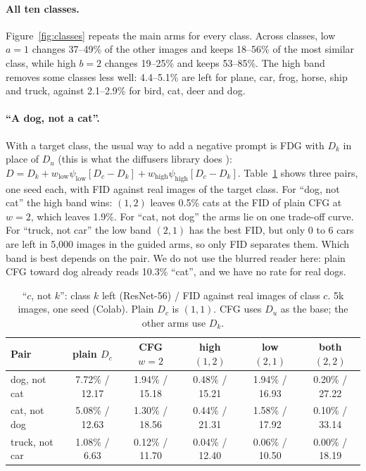 \documentclass[11pt]{article}
\newcommand{\low}{\psi_{\mathrm{low}}}
\newcommand{\high}{\psi_{\mathrm{high}}}
\begin{document}
\paragraph{All ten classes.} Figure~\ref{fig:classes} repeats the main arms for every class. Across classes, low $a = 1$
changes 37--49\% of the other images and keeps 18--56\% of the most similar class, while high $b = 2$ changes 19--25\%
and keeps 53--85\%. The high band removes some classes less well: 4.4--5.1\% are left for plane, car, frog, horse, ship
and truck, against 2.1--2.9\% for bird, cat, deer and dog.

\paragraph{``A dog, not a cat''.} With a target class, the usual way to add a negative prompt is FDG with $D_k$ in place
of $D_u$ (this is what the diffusers library does \cite{diffusers}): $D = D_k + w_{\mathrm{low}} \low[D_c - D_k] +
w_{\mathrm{high}} \high[D_c - D_k]$. Table~\ref{tab:pairs} shows three pairs, one seed each, with FID against real
images of the target class. For ``dog, not cat'' the high band wins: $(1,2)$ leaves 0.5\% cats at the FID of plain CFG
at $w = 2$, which leaves 1.9\%. For ``cat, not dog'' the arms lie on one trade-off curve. For ``truck, not car'' the
low band $(2,1)$ has the best FID, but only 0 to 6 cars are left in 5,000 images in the guided arms, so only FID
separates them. Which band is best depends on the pair. We do not use the blurred reader here: plain CFG toward dog
already reads 10.3\% ``cat'', and we have no rate for real dogs.

\begin{table}[t]
  \centering
  \small
  \caption{``$c$, not $k$'': class $k$ left (ResNet-56) / FID against real images of class $c$. 5k images, one seed
  (Colab). Plain $D_c$ is $(1,1)$. CFG uses $D_u$ as the base; the other arms use $D_k$.}
  \label{tab:pairs}
  \begin{tabular}{lccccc}
    \toprule
    Pair & plain $D_c$ & CFG $w = 2$ & high $(1,2)$ & low $(2,1)$ & both $(2,2)$ \\
    \midrule
    dog, not cat   & 7.72\% / 12.17 & 1.94\% / 15.18 & 0.48\% / 15.21 & 1.94\% / 16.93 & 0.20\% / 27.22 \\
    cat, not dog   & 5.08\% / 12.63 & 1.30\% / 18.56 & 0.44\% / 21.31 & 1.58\% / 17.92 & 0.10\% / 33.14 \\
    truck, not car & 1.08\% / 6.63  & 0.12\% / 11.70 & 0.04\% / 12.40 & 0.06\% / 10.50 & 0.00\% / 18.19 \\
    \bottomrule
  \end{tabular}
\end{table}
\end{document}
